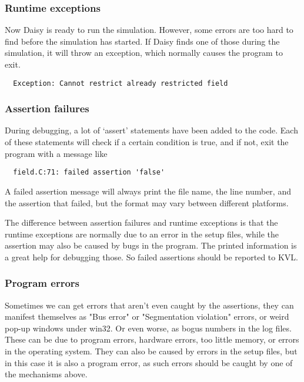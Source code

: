 \subsubsection{Runtime exceptions}

Now Daisy is ready to run the simulation.  However, some errors are
too hard to find before the simulation has started.  If Daisy finds
one of those during the simulation, it will throw an exception, which
normally causes the program to exit.  
\begin{verbatim}
  Exception: Cannot restrict already restricted field
\end{verbatim}

\subsubsection{Assertion failures}

During debugging, a lot of `assert' statements have been added to the
code.  Each of these statements will check if a certain condition is
true, and if not, exit the program with a message like
\begin{verbatim}
  field.C:71: failed assertion 'false'
\end{verbatim}
A failed assertion message will always print the file name, the line
number, and the assertion that failed, but the format may vary between
different platforms.  

The difference between assertion failures and runtime exceptions is
that the runtime exceptions are normally due to an error in the setup
files, while the assertion may also be caused by bugs in the program.
The printed information is a great help for debugging those.  So
failed assertions should be reported to KVL.

\subsubsection{Program errors}

Sometimes we can get errors that aren't even caught by the assertions,
they can manifest themselves as "Bus error" or "Segmentation
violation" errors, or weird pop-up windows under win32.  Or even
worse, as bogus numbers in the log files.  These can be due to program
errors, hardware errors, too little memory, or errors in the operating
system.  They can also be caused by errors in the setup files, but in
this case it is also a program error, as such errors should be caught
by one of the mechanisms above.



